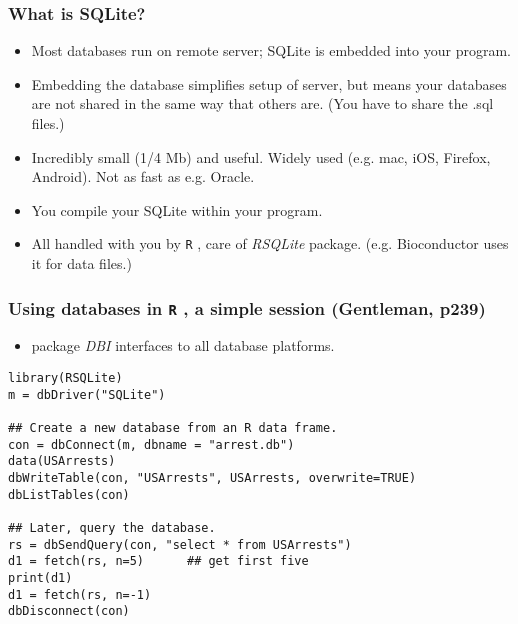 \documentclass{beamer}
\newcommand{\R}{\texttt{R} }
\begin{document}
\begin{frame}
\frametitle{What is SQLite?}
\label{sec-4-5}


\begin{itemize}
\item Most databases run on remote server; SQLite is embedded into your
  program.
\item Embedding the database simplifies setup of server, but means your
  databases are not shared in the same way that others are.  (You have
  to share the .sql files.)
\item Incredibly small (1/4 Mb) and useful.  Widely used (e.g. mac, iOS,
  Firefox, Android).  Not as fast as e.g. Oracle.
\item You compile your SQLite within your program.
\item All handled with you by \R, care of \emph{RSQLite} package.
  (e.g. Bioconductor uses it for data files.)
\end{itemize}
\end{frame}
\begin{frame}[fragile]
\frametitle{Using databases in \R, a simple session (Gentleman, p239)}
\label{sec-4-6}


\begin{itemize}
\item package \emph{DBI} interfaces to all database platforms.
\end{itemize}


\begin{verbatim}
library(RSQLite)
m = dbDriver("SQLite")

## Create a new database from an R data frame.
con = dbConnect(m, dbname = "arrest.db")
data(USArrests)
dbWriteTable(con, "USArrests", USArrests, overwrite=TRUE)
dbListTables(con)

## Later, query the database.
rs = dbSendQuery(con, "select * from USArrests")
d1 = fetch(rs, n=5)      ## get first five
print(d1)
d1 = fetch(rs, n=-1)
dbDisconnect(con)
\end{verbatim}
\end{frame}
\end{document}
